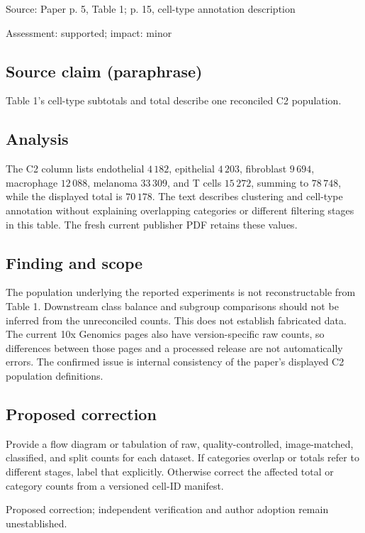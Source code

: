 \documentclass[11pt]{article}
\begin{document}
Source: Paper p. 5, Table 1; p. 15, cell-type annotation description

Assessment: supported; impact: minor

\subsection*{Source claim (paraphrase)}

Table 1's cell-type subtotals and total describe one reconciled C2 population.

\subsection*{Analysis}

The C2 column lists endothelial \(4\,182\), epithelial \(4\,203\), fibroblast \(9\,694\), macrophage \(12\,088\), melanoma \(33\,309\), and T cells \(15\,272\), summing to \(78\,748\), while the displayed total is \(70\,178\). The text describes clustering and cell-type annotation without explaining overlapping categories or different filtering stages in this table. The fresh current publisher PDF retains these values.

\subsection*{Finding and scope}

The population underlying the reported experiments is not reconstructable from Table 1. Downstream class balance and subgroup comparisons should not be inferred from the unreconciled counts. This does not establish fabricated data. The current 10x Genomics pages also have version-specific raw counts, so differences between those pages and a processed release are not automatically errors. The confirmed issue is internal consistency of the paper's displayed C2 population definitions.

\subsection*{Proposed correction}

Provide a flow diagram or tabulation of raw, quality-controlled, image-matched, classified, and split counts for each dataset. If categories overlap or totals refer to different stages, label that explicitly. Otherwise correct the affected total or category counts from a versioned cell-ID manifest.

Proposed correction; independent verification and author adoption remain unestablished.
\end{document}
